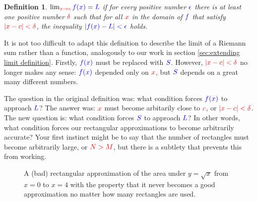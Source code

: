 \documentclass{myarticle}
\newcommand{\hor}[1]{\textcolor{red}{#1}} %
\newcommand{\ver}[1]{\textcolor{blue}{#1}}
\theoremstyle{nospace}
\newtheorem*{oldattempt}{Definition}
\newenvironment{attempt}{\begin{mdframed}\begin{oldattempt}}{\end{oldattempt}\end{mdframed}}
\newtheorem{old series theorem}{Theorem}
\newenvironment{series theorem}{\begin{mdframed}\begin{old series theorem}}{\end{old series theorem}\end{mdframed}}
\begin{document}
\begin{attempt} $\lim_{\hor{x \to c}} \ver{f(x)} = \ver{L}$ if for every positive number $\ver{\epsilon}$ there is at least one positive number $\hor{\delta}$ such that for all $\hor{x}$ in the domain of $\ver{f}$ that satisfy $\hor{|x - c| < \delta}$, the inequality $\ver{|f(x) - L| < \epsilon}$ holds. \end{attempt}

It is not too difficult to adapt this definition to describe the limit of a Riemann sum rather than a function, analogously to our work in section \ref{sec:extending limit definition}. Firstly, $\ver{f(x)}$ must be replaced with $\ver{S}$. However, $\hor{|x - c| < \delta}$ no longer makes any sense: $\ver{f(x)}$ depended only on $\hor{x}$, but $\ver{S}$ depends on a great many different numbers.

The question in the original definition was: what condition forces $\ver{f(x)}$ to approach $\ver{L}$? The answer was: $\hor{x}$ must become arbitarily close to $\hor{c}$, or $\hor{|x - c| < \delta}$. The new question is: what condition forces $\ver{S}$ to approach $\ver{L}$? In other words, what condition forces our rectangular approximations to become arbitrarily accurate? Your first instinct might be to say that the number of rectangles must become arbitrarily large, or $\hor{N > M}$, but there is a subtlety that prevents this from working.

\begin{figure}[htb!] \centering
{}
\caption{A (bad) rectangular approximation of the area under $y = \sqrt{x}$ from $x = 0$ to $x = 4$ with the property that it never becomes a good approximation no matter how many rectangles are used.}
\label{fig:bad approximation}
\end{figure}
\end{document}

